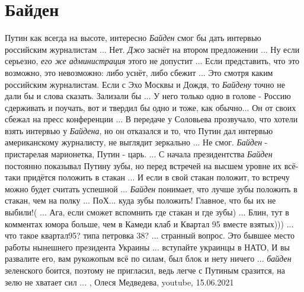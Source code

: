  
 
 
 
 
\chapter{Байден}
\label{sec:slova.bajden}

Путин как всегда на высоте, интересно \emph{Байден} смог бы дать интервью
российским журналистам ...  Нет. \emph{Джо} заснёт на втором предложении ...
Ну если серьезно, \emph{его же администрация} этого не допустит ...  Если
представить, что это возможно, это невозможно: либо уснёт, либо сбежит ...  Это
смотря каким российским журналистам. Если с Эхо Москвы и Дождя, то
\emph{Байдену} точно не дали бы и слова сказать. Зализали бы ...  У него только
одно в голове -  Россию сдерживать и поучать, вот и твердил бы одно и тоже, как
обычно...  Он от своих сбежал на пресс конференции ...  В передаче у Соловьева
прозвучало, что хотели взять интервью у \emph{Байдена}, но он отказался и то,
что Путин дал интервью американскому журналисту, не выглядит зеркально ... Не
смог. \emph{Байден} - пристарелая марионетка,  Путин - царь. ...  С начала
президентства \emph{Байден} постоянно показывал Путину зубы, но перед встречей
на высшем уровне их всё-таки придётся положить в стакан ...  И если в свой
стакан положит, то встречу можно будет считать успешной ...  \emph{Байден}
понимает, что лучше зубы положить в стакан, чем на полку ...  ПоХ... куда зубы
положить!  Главное, что бы их не выбили!( ...  Ага, если сможет вспомнить где
стакан и где зубы) ...  Блин, тут в комментах юмора больше, чем в Камеди клаб и
Квартал 95 вместе взятых))) ... что такое квартал95? типа петровка 38? ...
странный вопрос. Это бывшее место работы нынешнего президента Украины ...
вступайте украинцы в НАТО, И вы развалите его, вам рукожопым всё по силам, был
блок и нету ничего ... \emph{байден} зеленского боится, поэтому не пригласил,
ведь легче с Путиным сразится, на зелю не хватает сил ... 
,
Олеся Медведева, youtube, 15.06.2021
